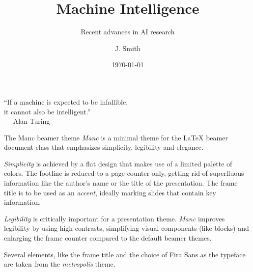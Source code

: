 \documentclass[compress, aspectratio = 32]{beamer}
\title{Machine Intelligence}
\subtitle{Recent advances in AI research}
\date{\today}
\author{J. Smith}
\institute{Institute of Advanced Robotics}
\begin{document}
\begin{frame}
  \titlepage
\end{frame}

\begin{frame}
  \centering
  \begin{tcolorbox}[
    before skip=30mm,
    after skip=30mm,
    boxrule=2pt,
    sharp corners,
    fonttitle=\usebeamerfont{block title},
    fontupper=\usebeamerfont{block body},
    fontlower=\usebeamerfont{block body},
    boxsep=.5mm,
    parbox=false,
    width=30em,
  ]
    \enquote{If a machine is expected to be infallible,\\[-0.5ex] it cannot also be intelligent.}\\
    \hfill \textup{— Alan Turing}
  \end{tcolorbox}
\end{frame}

\begin{frame}{The Manc beamer theme}
  \emph{Manc} is a minimal theme for the \LaTeX{} beamer document class that emphasizes simplicity, legibility and elegance.

  \emph{Simplicity} is achieved by a flat design that makes use of a limited palette of colors. The footline is reduced to a page counter only, getting rid of superfluous information like the author's name or the title of the presentation.
  The frame title is to be used as an \emph{accent}, ideally marking slides that contain key information.

  \emph{Legibility} is critically important for a presentation theme.
  \emph{Manc} improves legibility by using high contrasts, simplifying visual components (like blocks) and enlarging the frame counter compared to the default beamer themes.

  Several elements, like the frame title and the choice of Fira Sans as the typeface are taken from the \emph{metropolis} theme.
\end{frame}
\end{document}
